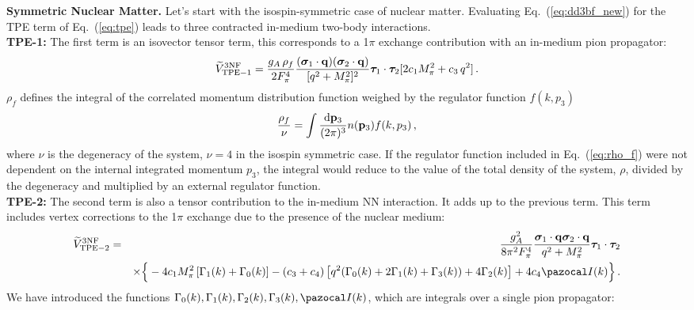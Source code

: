 {\bf Symmetric Nuclear Matter.} Let's start with the isospin-symmetric case of nuclear matter. Evaluating Eq.~(\ref{eq:dd3bf_new}) for the TPE term of Eq.~(\ref{eq:tpe}) leads to three contracted in-medium two-body interactions.\\ %
{\bf TPE-1:} The first term is an isovector tensor term, this corresponds to a 1$\pi$ exchange contribution with an in-medium pion propagator:
\begin{equation}
\widetilde V_\mathrm{TPE-1}^\mathrm{3NF}=\frac{g_A\,\rho_f}{2 F_\pi^4}
\frac{(\boldsymbol\sigma_1\cdot{\bf q})(\boldsymbol\sigma_2\cdot{\bf q})}{[q^2 + M_\pi^2]^2}
\boldsymbol\tau_1\cdot\boldsymbol\tau_2[2 c_1M_\pi^2+ c_3\,q^2]\,.
\label{eq:tpe_dd_1}
\end{equation}
$\rho_f$ defines the integral of the correlated momentum distribution function weighed by the regulator function $f(k,p_3)$
\begin{equation}
\frac{\rho_f}{\nu}=\int \frac{{\mathrm d}{\bf p}_3}{(2\pi)^3}n({\bf p}_3)f(k,p_3)\,,
\label{eq:rho_f}
\end{equation}
where $\nu$ is the degeneracy of the system, $\nu=4$ in the isospin symmetric case. If the regulator function included in Eq.~(\ref{eq:rho_f}) were not dependent on the internal integrated momentum $p_3$, the integral would reduce to the value of the total density of the system, $\rho$, divided by the degeneracy and multiplied by an external regulator function.\\ 
{\bf TPE-2:} The second term is also a tensor contribution to the in-medium NN interaction. It adds up to the previous term. %
This term includes vertex corrections to the 1$\pi$ exchange due to the presence of the nuclear medium:
\begin{eqnarray}
\widetilde V_\mathrm{TPE-2}^\mathrm{3NF}&=& \frac{g_A^2}{8\pi^2F_\pi^4}
\frac{\boldsymbol\sigma_1\cdot{\bf q}\boldsymbol\sigma_2\cdot{\bf q}}{q^2 + M_\pi^2} \boldsymbol\tau_1\cdot\boldsymbol\tau_2
\\ \nonumber && 
\times
\Big\{-4c_1M_\pi^2\left[\Gamma_1(k)+\Gamma_0(k)\right]
-(c_3+c_4)\left[q^2(\Gamma_0(k)+2\Gamma_1(k)+\Gamma_3(k))+4\Gamma_2(k)\right]
+4c_4{\pazocal I}(k)\Big\}\,.
\label{eq:tpe_dd_2}
\end{eqnarray}
We have introduced the functions $\Gamma_0(k), \Gamma_1(k), \Gamma_2(k), \Gamma_3(k), {\pazocal I}(k)$, which are integrals over a single pion propagator:
